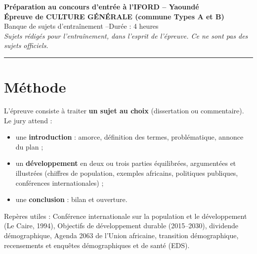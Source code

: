 \documentclass[11pt,a4paper]{article}
\begin{document}
\begin{center}
{\large\bfseries Préparation au concours d'entrée à l'IFORD -- Yaoundé}\\[2mm]
{\Large\bfseries Épreuve de CULTURE GÉNÉRALE (commune Types A et B)}\\[2mm]
Banque de sujets d'entraînement \quad --\quad Durée : 4 heures\\[1mm]
\emph{Sujets rédigés pour l'entraînement, dans l'esprit de l'épreuve. Ce ne sont pas des sujets officiels.}
\end{center}
\hrule\medskip

\section*{Méthode}
L'épreuve consiste à traiter \textbf{un sujet au choix} (dissertation ou commentaire).
Le jury attend :
\begin{itemize}
  \item une \textbf{introduction} : amorce, définition des termes, problématique, annonce du plan ;
  \item un \textbf{développement} en deux ou trois parties équilibrées, argumentées et illustrées
  (chiffres de population, exemples africains, politiques publiques, conférences internationales) ;
  \item une \textbf{conclusion} : bilan et ouverture.
\end{itemize}
Repères utiles : Conférence internationale sur la population et le développement (Le Caire, 1994),
Objectifs de développement durable (2015--2030), dividende démographique, Agenda 2063 de l'Union africaine,
transition démographique, recensements et enquêtes démographiques et de santé (EDS).
\end{document}
